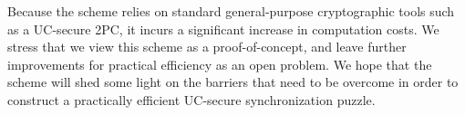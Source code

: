 Because the scheme relies on standard general-purpose cryptographic tools such as a UC-secure 2PC, it incurs a significant increase in computation costs. We stress that we view this scheme as a proof-of-concept, and leave further improvements for practical efficiency as an open problem.  We hope that the scheme will shed some light on the barriers that need to be overcome in order to construct a practically efficient UC-secure synchronization puzzle.